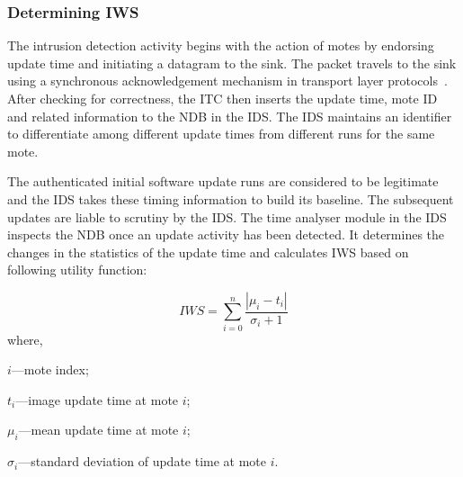 \documentclass[conference]{IEEEtran}
\newcommand{\notedme}[1]{\raisebox{0pt}[0pt][0pt]{\pdfcomment[open=true,color=blue]{#1}}}
\begin{document}
\subsubsection*{Determining IWS}
\label{ssc:cal_iws}
The intrusion detection activity begins with the action of motes by endorsing update time and initiating a datagram to the sink. 
The packet travels to the sink using a synchronous acknowledgement mechanism in transport layer protocols~\cite{tep116}.
After checking for correctness, the ITC then inserts the update time, mote ID and related information to the NDB in the IDS.
The IDS maintains an identifier to differentiate among different update times from different runs for the same mote.
%

The authenticated initial software update runs are considered to be legitimate and the IDS takes these timing information to build its baseline.
The subsequent updates are liable to scrutiny by the IDS.
The time analyser module in the IDS inspects the NDB once an update activity has been detected.
It determines the changes in the statistics of the update time and calculates IWS based on following utility function:

\begin{equation}
\label{eqn2} 
	\mathit{IWS} = \sum \limits_{i=0}^{n} \frac{\left| \mu_i - t_i \right|}{\sigma_i + 1}
\end{equation}
where, 
\begin{inparaenum}
\item $\mathit{i}$---mote index;%
\item $\mathit{t_i}$---image update time at mote $\mathit{i}$;  
\item $\mathit{\mu_i}$---mean update time at mote $\mathit{i}$;  
\item $\mathit{\sigma_i}$---standard deviation of update time at mote $\mathit{i}$. 
\end{inparaenum}	
\end{document}
